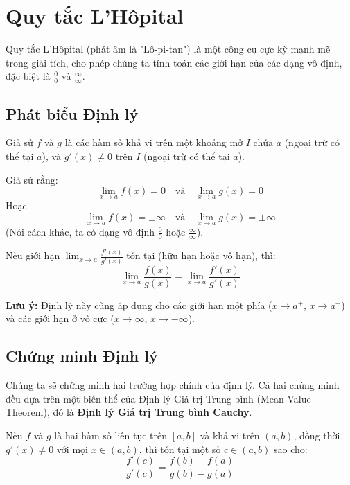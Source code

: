 
\chapter{Quy tắc L'Hôpital}

Quy tắc L'Hôpital (phát âm là "Lô-pi-tan") là một công cụ cực kỳ mạnh mẽ trong giải tích, cho phép chúng ta tính toán các giới hạn của các dạng vô định, đặc biệt là $\frac{0}{0}$ và $\frac{\infty}{\infty}$.

\section{Phát biểu Định lý}

\begin{theorem}
Giả sử $f$ và $g$ là các hàm số khả vi trên một khoảng mở $I$ chứa $a$ (ngoại trừ có thể tại $a$), và $g'(x) \neq 0$ trên $I$ (ngoại trừ có thể tại $a$).

Giả sử rằng:
$$ \lim_{x \to a} f(x) = 0 \quad \text{và} \quad \lim_{x \to a} g(x) = 0 $$
Hoặc
$$ \lim_{x \to a} f(x) = \pm\infty \quad \text{và} \quad \lim_{x \to a} g(x) = \pm\infty $$
(Nói cách khác, ta có dạng vô định $\frac{0}{0}$ hoặc $\frac{\infty}{\infty}$).

Nếu giới hạn $\lim_{x \to a} \frac{f'(x)}{g'(x)}$ tồn tại (hữu hạn hoặc vô hạn), thì:
$$ \lim_{x \to a} \frac{f(x)}{g(x)} = \lim_{x \to a} \frac{f'(x)}{g'(x)} $$
\end{theorem}

\noindent
\textbf{Lưu ý:} Định lý này cũng áp dụng cho các giới hạn một phía ($x \to a^+$, $x \to a^-$) và các giới hạn ở vô cực ($x \to \infty$, $x \to -\infty$).

\section{Chứng minh Định lý}

Chúng ta sẽ chứng minh hai trường hợp chính của định lý. Cả hai chứng minh đều dựa trên một biến thể của Định lý Giá trị Trung bình (Mean Value Theorem), đó là \textbf{Định lý Giá trị Trung bình Cauchy}.

\begin{theorem}
Nếu $f$ và $g$ là hai hàm số liên tục trên $[a, b]$ và khả vi trên $(a, b)$, đồng thời $g'(x) \neq 0$ với mọi $x \in (a, b)$, thì tồn tại một số $c \in (a, b)$ sao cho:
$$ \frac{f'(c)}{g'(c)} = \frac{f(b) - f(a)}{g(b) - g(a)} $$
\end{theorem}


